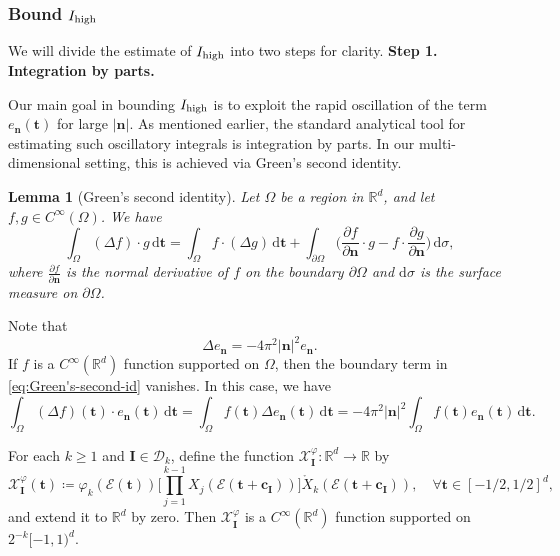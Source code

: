 \documentclass[12pt]{amsart}
\newtheorem{lemma}[theorem]{Lemma}
\theoremstyle{definition}
\theoremstyle{remark}
\newcommand{\bt}{\boldsymbol{t}}
\newcommand{\R}{\mathbb{R}}
\numberwithin{equation}{section}
\begin{document}
\subsubsection{Bound $I_{\textnormal{high}}$}\label{sssec:Bound-Ihigh}
We will divide the estimate of $I_{\textnormal{high}}$ into two steps for clarity.
\medskip
{\flushleft \bf Step 1. Integration by parts.}
\medskip

Our main goal in bounding $I_{\textnormal{high}}$ is to exploit the rapid oscillation of the term $e_{\boldsymbol{n}}(\bt)$ for large $|\boldsymbol{n}|$. As mentioned earlier, the standard analytical tool for estimating such oscillatory integrals is integration by parts. In our multi-dimensional setting, this is achieved via Green's second identity.
\begin{lemma}[Green's second identity]\label{lemma:Green's-second-id}
Let $\Omega$ be a region in $\R^d$, and let $f,g\in C^\infty(\Omega)$. We have
\begin{equation}\label{eq:Green's-second-id}
\int_{\Omega}(\Delta f)\cdot g\,\mathrm{d}\bt=\int_{\Omega} f\cdot (\Delta g)\,\mathrm{d}\bt+\int_{\partial \Omega} \bigg(\frac{\partial f}{\partial \boldsymbol{n}}\cdot g-f\cdot \frac{\partial g}{\partial \boldsymbol{n}}\bigg)\,\mathrm{d}\sigma,
\end{equation}
where $\frac{\partial f}{\partial \boldsymbol{n}}$ is the normal derivative of $f$ on the boundary $\partial \Omega$ and $\mathrm{d}\sigma$ is the surface measure on $\partial \Omega$.
\end{lemma}
Note that
\[
\Delta e_{\boldsymbol{n}}=-4\pi^2|\boldsymbol{n}|^2e_{\boldsymbol{n}}.
\]
If $f$ is a $C^\infty(\R^d)$ function supported on $\Omega$, then the boundary term in \eqref{eq:Green's-second-id} vanishes. In this case, we have
\begin{equation}\label{eq:Green's-second-id-2}
\int_{\Omega}(\Delta f)(\bt)\cdot e_{\boldsymbol{n}}(\bt)\,\mathrm{d}\bt=\int_\Omega f(\bt)\Delta e_{\boldsymbol{n}}(\bt)\,\mathrm{d}\bt=-4\pi^2|\boldsymbol{n}|^2\int_{\Omega} f(\bt)e_{\boldsymbol{n}}(\bt)\,\mathrm{d}\bt.
\end{equation}

For each $k\ge 1$ and $\boldsymbol{I}\in \mathscr{D}_k$, define the function $\mathcal{X}_{\boldsymbol{I}}^\varphi\colon \R^d\to \R$ by
\[
\mathcal{X}_{\boldsymbol{I}}^\varphi(\bt)\coloneq \varphi_k(\mathcal{E}(\bt))\bigg[\prod_{j=1}^{k-1}X_j(\mathcal{E}(\bt+\boldsymbol{c_I}))\bigg]\mathring{X}_k(\mathcal{E}(\bt+\boldsymbol{c_I})),\quad \forall \bt\in [-1/2,1/2]^d, 
\]
and extend it to $\R^d$ by zero. Then $\mathcal{X}_{\boldsymbol{I}}^\varphi$ is a $C^\infty(\R^d)$ function supported on $2^{-k}[-1,1)^d$. 
\end{document}
